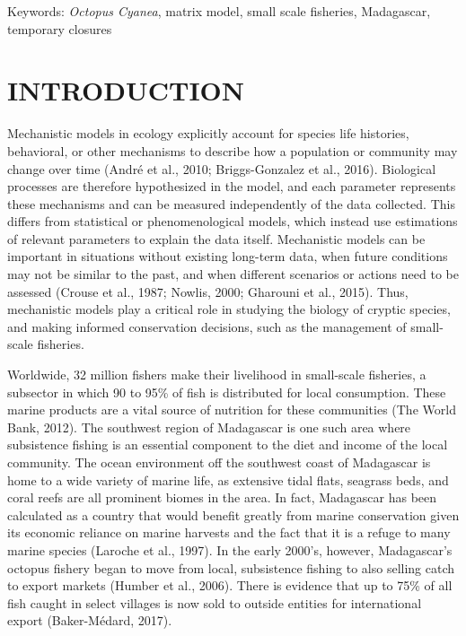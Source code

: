 \documentclass[
]{article}
\begin{document}
Keywords: \emph{Octopus Cyanea}, matrix model, small scale fisheries, Madagascar, temporary closures

\hypertarget{introduction}{%
\section{INTRODUCTION}\label{introduction}}

Mechanistic models in ecology explicitly account for species life histories, behavioral, or other mechanisms to describe how a population or community may change over time (André et al., 2010; Briggs-Gonzalez et al., 2016). Biological processes are therefore hypothesized in the model, and each parameter represents these mechanisms and can be measured independently of the data collected. This differs from statistical or phenomenological models, which instead use estimations of relevant parameters to explain the data itself. Mechanistic models can be important in situations without existing long-term data, when future conditions may not be similar to the past, and when different scenarios or actions need to be assessed (Crouse et al., 1987; Nowlis, 2000; Gharouni et al., 2015). Thus, mechanistic models play a critical role in studying the biology of cryptic species, and making informed conservation decisions, such as the management of small-scale fisheries.

Worldwide, 32 million fishers make their livelihood in small-scale fisheries, a subsector in which 90 to 95\% of fish is distributed for local consumption. These marine products are a vital source of nutrition for these communities (The World Bank, 2012). The southwest region of Madagascar is one such area where subsistence fishing is an essential component to the diet and income of the local community. The ocean environment off the southwest coast of Madagascar is home to a wide variety of marine life, as extensive tidal flats, seagrass beds, and coral reefs are all prominent biomes in the area. In fact, Madagascar has been calculated as a country that would benefit greatly from marine conservation given its economic reliance on marine harvests and the fact that it is a refuge to many marine species (Laroche et al., 1997). In the early 2000's, however, Madagascar's octopus fishery began to move from local, subsistence fishing to also selling catch to export markets (Humber et al., 2006). There is evidence that up to 75\% of all fish caught in select villages is now sold to outside entities for international export (Baker-Médard, 2017).
\end{document}
